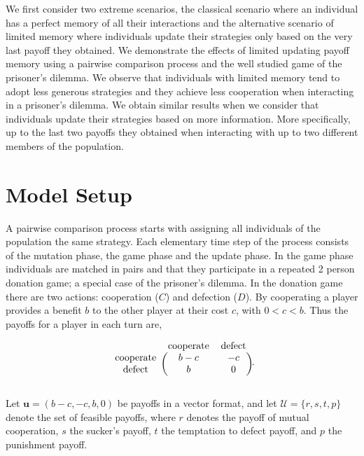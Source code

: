 \documentclass[11pt]{article}
\theoremstyle{plainCl1}
\theoremstyle{plainCl2}
\begin{document}
We first consider two extreme scenarios, the classical scenario where an individual
has a perfect memory of all their interactions and the alternative scenario of
limited memory where individuals update their strategies only based on the very
last payoff they obtained. We demonstrate the effects of limited updating payoff
memory using a pairwise comparison process and the well studied game of the
prisoner's dilemma. We observe that individuals with limited memory tend to
adopt less generous strategies and they achieve less cooperation when
interacting in a prisoner's dilemma. We obtain similar results when we consider
that individuals update their strategies based on more information. More
specifically, up to the last two payoffs they obtained when interacting with up
to two different members of the population.

\section{Model Setup}\label{section:model}

A pairwise comparison process starts with assigning all
individuals of the population the same strategy. Each elementary time step of
the process consists of the mutation phase, the game phase and the update phase.
In the game phase individuals are matched in pairs and that they participate in
a repeated 2 person donation game; a special case of the prisoner's dilemma. In
the donation game there are two actions: cooperation (\(C\)) and defection
(\(D\)). By cooperating a player provides a benefit \(b\) to the other player at
their cost \(c\), with \(0 < c < b\). Thus the payoffs for a player in each turn
are,

\begin{equation}
    \begin{blockarray}{ccc}
        & \text{cooperate} & \text{defect} \\
        \begin{block}{c(cc)}
            \text{cooperate} & b - c & -c \\
            \text{defect} & b & 0 \\
        \end{block}
    \end{blockarray}.
\end{equation}

Let \(\mathbf{u} = (b-c, -c, b, 0)\) be payoffs in a vector format, and let
\(\mathcal{U} = \{r, s, t, p\}\) denote the set of feasible payoffs, where \(r\)
denotes the payoff of mutual cooperation, \(s\) the sucker's payoff, \(t\) the
temptation to defect payoff, and \(p\) the punishment payoff.
\end{document}
